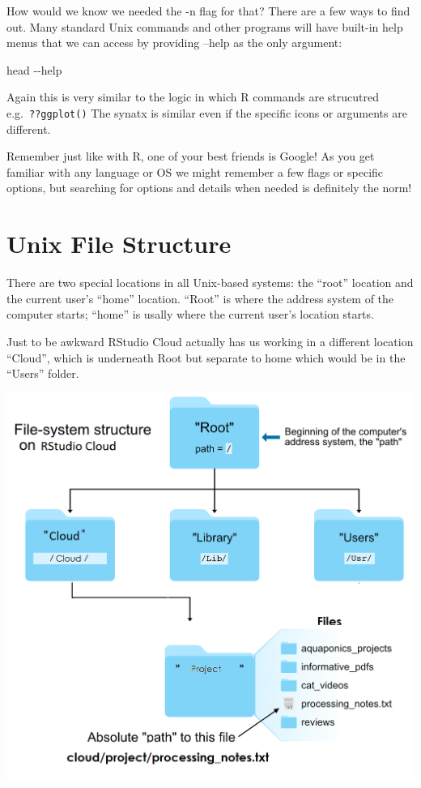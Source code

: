 \documentclass[
]{book}
\newenvironment{Shaded}{\begin{snugshade}}{\end{snugshade}}
\newcommand{\AttributeTok}[1]{\textcolor[rgb]{0.77,0.63,0.00}{#1}}
\newcommand{\FunctionTok}[1]{\textcolor[rgb]{0.00,0.00,0.00}{#1}}
\begin{document}
How would we know we needed the -n flag for that? There are a few ways to find out. Many standard Unix commands and other programs will have built-in help menus that we can access by providing --help as the only argument:

\begin{Shaded}
\begin{Highlighting}[]
    \FunctionTok{head} \AttributeTok{{-}{-}help}
\end{Highlighting}
\end{Shaded}

Again this is very similar to the logic in which R commands are strucutred e.g.~\texttt{??ggplot()} The synatx is similar even if the specific icons or arguments are different.

Remember just like with R, one of your best friends is Google! As you get familiar with any language or OS we might remember a few flags or specific options, but searching for options and details when needed is definitely the norm!

\hypertarget{unix-file-structure}{%
\section{Unix File Structure}\label{unix-file-structure}}

There are two special locations in all Unix-based systems: the ``root'' location and the current user's ``home'' location. ``Root'' is where the address system of the computer starts; ``home'' is usally where the current user's location starts.

Just to be awkward RStudio Cloud actually has us working in a different location ``Cloud'', which is underneath Root but separate to home which would be in the ``Users'' folder.

\begin{center}\includegraphics[width=0.8\linewidth]{images/file_system_structure} \end{center}
\end{document}
